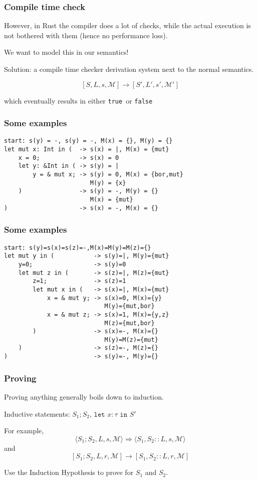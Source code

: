 \documentclass{beamer}
\newcommand{\tr}[0]{\texttt{true}}
\newcommand{\fa}[0]{\texttt{false}}
\newcommand{\letm}[2]{\texttt{let }#1 : \tau \texttt{ in } #2}
\newcommand{\sosb}[4]{\langle #1, #2, #3, \mathcal{#4} \rangle}
\newcommand{\ccb}[4]{[ #1, #2, #3, \mathcal{#4} ]}
\begin{document}
\begin{frame}[fragile]
\frametitle{Compile time check}
However, in Rust the compiler does a lot of checks, while the actual execution is not bothered with them (hence no performance loss).

We want to model this in our semantics!

Solution: a compile time checker derivation system next to the normal semantics.

$$\ccb{S}{L}{s}{M} \to \ccb{S'}{L'}{s'}{M'}$$

which eventually results in either \tr ~or \fa
\end{frame}


\begin{frame}[fragile]
\frametitle{Some examples}
\begin{lstlisting}
start: s(y) = -, s(y) = -, M(x) = {}, M(y) = {}                          
let mut x: Int in (  -> s(x) = |, M(x) = {mut}
    x = 0;           -> s(x) = 0
    let y: &Int in ( -> s(y) = |
        y = & mut x; -> s(y) = 0, M(x) = {bor,mut}
                        M(y) = {x}
    )                -> s(y) = -, M(y) = {}
                        M(x) = {mut}
)                    -> s(x) = -, M(x) = {}
\end{lstlisting}
\end{frame}


\begin{frame}[fragile]
\frametitle{Some examples}
\begin{lstlisting}
start: s(y)=s(x)=s(z)=-,M(x)=M(y)=M(z)={}
let mut y in (           -> s(y)=|, M(y)={mut}
    y=0;                 -> s(y)=0
    let mut z in (       -> s(z)=|, M(z)={mut}
        z=1;             -> s(z)=1
        let mut x in (   -> s(x)=|, M(x)={mut}
            x = & mut y; -> s(x)=0, M(x)={y}
                            M(y)={mut,bor}
            x = & mut z; -> s(x)=1, M(x)={y,z}
                            M(z)={mut,bor}
        )                -> s(x)=-, M(x)={}
                            M(y)=M(z)={mut}
    )                    -> s(z)=-, M(z)={}
)                        -> s(y)=-, M(y)={}
\end{lstlisting}
\end{frame}


\begin{frame}
\frametitle{Proving}
Proving anything generally boils down to induction.

Inductive statements:  $S_1; S_2$, $\letm{x}{S'}$

For example, 
$$\sosb{S_1; S_2}{L}{s}{M} \Rightarrow \sosb{S_1}{S_2::L}{s}{M}$$
and
$$\ccb{S_1; S_2}{L}{r}{M} \to \ccb{S_1}{S_2::L}{r}{M}$$

Use the Induction Hypothesis to prove for $S_1$ and $S_2$. 
\end{frame}
\end{document}

